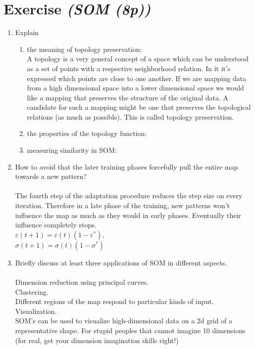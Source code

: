 \documentclass{article}
\begin{document}
\section{Exercise \textit{(SOM (8p))}}
\begin{enumerate}
    \item Explain\\
        \begin{enumerate}
            \item the meaning of topology preservation: \\
             A topology is a very general concept of a space which can be understood as a set of points with a respective neighborhood relation. In it it's expressed which points are close to one another. If we are mapping data from a high dimensional space into a lower dimensional space we would like a mapping that preserves the structure of the original data. A candidate for such a mapping might be one that preserves the topological relations (as much as possible). This is called topology preservation.
            \item the properties of the topology function:
            \item measuring similarity in SOM:
        \end{enumerate}
    \item How to avoid that the later training phases forcefully pull the entire
        map towards a new pattern?\\
        \\
        The fourth step of the adaptation procedure reduces the step size on every iteration. Therefore in a late phase of the training, new patterns won't influence the map as much as they would in early phases. Eventually their influence completely stops. \\
        $\varepsilon(t+1) = \varepsilon(t) (1 - \varepsilon^*)$, \\
	$\sigma(t+1) = \sigma(t) (1 - \sigma^*)$
    \item  Briefly discuss at least three applications of SOM in different aspects.\\
        \\
        Dimension reduction using principal curves. \\
        Clustering. \\
        Different regions of the map respond to particular kinds of input.\\
        Visualization. \\
        SOM's can be used to visualize high-dimensional data on a 2d grid of a representative shape. For stupid peoples that cannot imagine 10 dimensions (for real, get your dimension imagination skills right!)
\end{enumerate}
\end{document}
